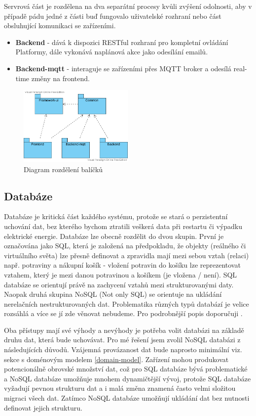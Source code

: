 Servrová část je rozdělena na dva separátní procesy kvůli zvýšení odolnosti, aby v případě pádu jedné z části buď fungovalo uživatelské rozhraní nebo část obsluhující komunikaci se zařízeními.
\begin{itemize}
    \item \textbf{Backend} - dává k dispozici RESTful rozhraní pro kompletní ovládání Platformy, dále vykonává naplánová akce jako odesílání emailů.
    \item \textbf{Backend-mqtt} - interaguje se zařízeními přes MQTT broker a odesílá real-time změny na frontend.
\end{itemize}

\begin{figure}[htbp]
    \label{packages-uml}
    \centering
    \includegraphics[width=0.5\textwidth]{img/packages.pdf}
    \caption{Diagram rozdělení balíčků}
\end{figure}

\subsection{Databáze}
Databáze je kritická část každého systému, protože se stará o perzistentní uchování dat, bez kterého bychom ztratili veškerá data při restartu či výpadku elektrické energie. Databáze lze obecně rozdělit do dvou skupin. První je označována jako SQL, která je založená na předpokladu, že objekty (reálného či virtuálního světa) lze přesně definovat a zpravidla mají mezi sebou vztah (relaci) např. potraviny a nákupní košík - vložení potravin do košíku lze reprezentovat vztahem, který je mezi danou potravinou a košíkem (je vložena / není). SQL databáze se orientují právě na zachycení vztahů mezi strukturovanými daty. Naopak druhá skupina NoSQL (Not only SQL) se orientuje na ukládání nerelačních nestrukturovaných dat. Problematika různých typů databází je velice rozsáhlá a více se jí zde věnovat nebudeme. Pro podrobnější popis doporučuji \cite{sql-and-nosql}.

Oba přístupy mají své výhody a nevýhody je potřeba volit databázi na základě druhu dat, která bude uchovávat. Pro mé řešení jsem zvolil NoSQL databázi z následujících důvodů. Vzájemná provázanost dat bude naprosto minimální viz. sekce s doménovým modelem \ref{domain-model}. Zařízení mohou produkovat potencionálně obrovské množství dat, což pro SQL databáze bývá problematické a NoSQL databáze umožňuje mnohem dynamičtější vývoj, protože SQL databáze vyžadují pevnou strukturu dat a i malá změna znamená často velmi složitou migraci všech dat. Zatímco NoSQL databáze umožňují ukládání dat bez nutnosti definovat jejich strukturu.

